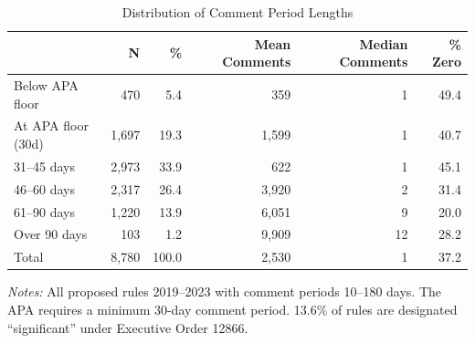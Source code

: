 \begin{table}[t]
\centering
\caption{Distribution of Comment Period Lengths}
\label{tab:distribution}
\begin{threeparttable}
\small
\begin{tabular}{lrrrrr}
\toprule
 & N & \% & Mean Comments & Median Comments & \% Zero \\
\midrule
Below APA floor & 470 & 5.4 & 359 & 1 & 49.4 \\
At APA floor (30d) & 1,697 & 19.3 & 1,599 & 1 & 40.7 \\
31--45 days & 2,973 & 33.9 & 622 & 1 & 45.1 \\
46--60 days & 2,317 & 26.4 & 3,920 & 2 & 31.4 \\
61--90 days & 1,220 & 13.9 & 6,051 & 9 & 20.0 \\
Over 90 days & 103 & 1.2 & 9,909 & 12 & 28.2 \\
\midrule
Total & 8,780 & 100.0 & 2,530 & 1 & 37.2 \\
\bottomrule
\end{tabular}
\begin{tablenotes}
\small
\item \textit{Notes:} All proposed rules 2019--2023 with comment periods 10--180 days. The APA requires a minimum 30-day comment period. 13.6\% of rules are designated ``significant'' under Executive Order 12866.
\end{tablenotes}
\end{threeparttable}
\end{table}
